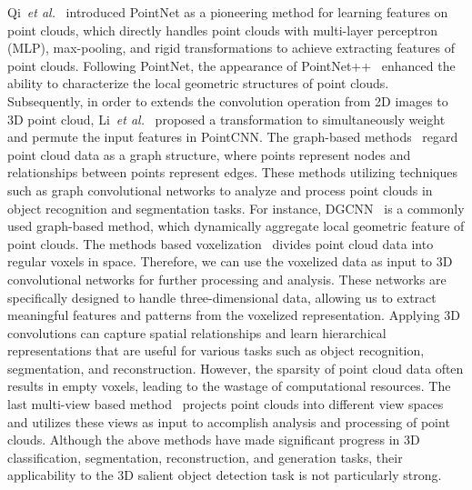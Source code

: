 Qi~\emph{et al.}~\cite{qi2017pointnet} introduced PointNet as a pioneering method for learning features on point clouds, which directly handles point clouds with multi-layer perceptron (MLP), max-pooling, and rigid transformations to achieve extracting features of point clouds. Following PointNet, the appearance of PointNet++~\cite{qi2017pointnet++} enhanced the ability to characterize the local geometric structures of point clouds. Subsequently, in order to extends the convolution operation from 2D images to 3D point cloud, Li~\emph{et al.}~\cite{li2018pointcnn} proposed a transformation to simultaneously weight and permute the input features in PointCNN. The graph-based methods~\cite{cheng2021sspc,cheng2020cascaded,shen2018mining} regard point cloud data as a graph structure, where points represent nodes and relationships between points represent edges. These methods utilizing techniques such as graph convolutional networks to analyze and process point clouds in object recognition and segmentation tasks. For instance, DGCNN~\cite{wang2019dynamic} is a commonly used graph-based method, which dynamically aggregate local geometric feature of point clouds. The methods based voxelization~\cite{choy20194d,liu2019point} divides point cloud data into regular voxels in space. Therefore, we can use the voxelized data as input to 3D convolutional networks for further processing and analysis. These networks are specifically designed to handle three-dimensional data, allowing us to extract meaningful features and patterns from the voxelized representation. Applying 3D convolutions can capture spatial relationships and learn hierarchical representations that are useful for various tasks such as object recognition, segmentation, and reconstruction. However, the sparsity of point cloud data often results in empty voxels, leading to the wastage of computational resources. The last multi-view based method~\cite{wu2019squeezesegv2,chen2020compositional} projects point clouds into different view spaces and utilizes these views as input to accomplish analysis and processing of point clouds. Although the above methods have made significant progress in 3D classification, segmentation, reconstruction, and generation tasks, their applicability to the 3D salient object detection task is not particularly strong.

